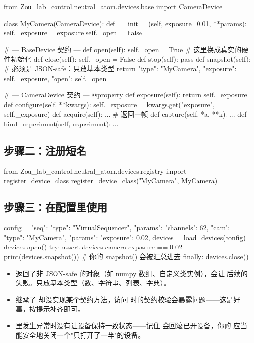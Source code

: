 \documentclass[11pt,oneside,openany]{book}
\begin{document}
\begin{codeblock}[Python]
from Zou_lab_control.neutral_atom.devices.base import CameraDevice

class MyCamera(CameraDevice):
    def __init__(self, exposure=0.01, **params):
        self._exposure = exposure
        self._open = False

    # --- BaseDevice 契约 ---
    def open(self):
        self._open = True          # 这里换成真实的硬件初始化
    def close(self):
        self._open = False
    def stop(self):
        pass
    def snapshot(self):
        # 必须是 JSON-safe：只放基本类型
        return {"type": "MyCamera", "exposure": self._exposure,
                "open": self._open}

    # --- CameraDevice 契约 ---
    @property
    def exposure(self):
        return self._exposure
    def configure(self, **kwargs):
        self._exposure = kwargs.get("exposure", self._exposure)
    def acquire(self):
        ...                        # 返回一帧
    def capture(self, *a, **k):
        ...
    def bind_experiment(self, experiment):
        ...
\end{codeblock}

\subsection{步骤二：注册短名}

\begin{codeblock}[Python]
from Zou_lab_control.neutral_atom.devices.registry import register_device_class
register_device_class("MyCamera", MyCamera)
\end{codeblock}

\subsection{步骤三：在配置里使用}

\begin{codeblock}[Python]
config = {
    "seq": {"type": "VirtualSequencer", "params": {"channels": 62}},
    "cam": {"type": "MyCamera",        "params": {"exposure": 0.02}},
}
devices = load_devices(config)
devices.open()
try:
    assert devices.camera.exposure == 0.02
    print(devices.snapshot())     # 你的 snapshot() 会被汇总进去
finally:
    devices.close()
\end{codeblock}

\begin{notebox}[自定义设备的常见坑]
\begin{itemize}
\item {} 返回了非 JSON-safe 的对象（如 numpy 数组、自定义类实例），会让  后续的  失败。只放基本类型（数、字符串、列表、字典）。
\item 继承了  却没实现某个契约方法，访问  时的契约校验会暴露问题——这是好事，按提示补齐即可。
\item {} 里发生异常时没有让设备保持一致状态——记住  会回滚已开设备，你的  应当能安全地关闭一个"只打开了一半"的设备。
\end{itemize}
\end{notebox}
\end{document}
